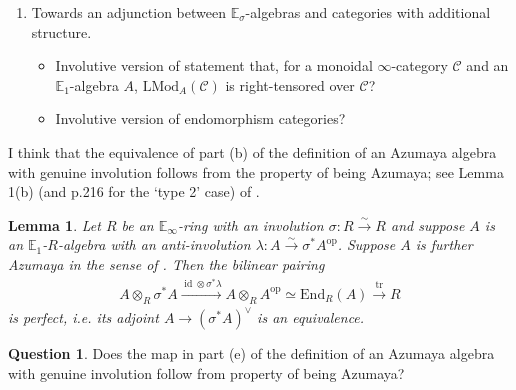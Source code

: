 \documentclass{article}
\DeclareMathOperator{\id}{id} %
\newcommand{\EE}{\mathbb{E}}
\newcommand{\op}{\mathrm{op}}
\newtheorem{lemma}[theorem]{Lemma}
\theoremstyle{definition}
\newtheorem{question}[theorem]{Question}
\newcommand{\Lucy}[1]{\todo[color=cyan!30]{\footnotesize L: #1}}
\begin{document}
\begin{enumerate}[label=(\alph*)]
\begin{itemize}
    \end{itemize} 
    \item Towards an adjunction between $ \EE_\sigma $-algebras and categories with additional structure.  
    \begin{itemize}
        \item Involutive version of statement that, for a monoidal $ \infty $-category $ \mathcal{C} $ and an $ \EE_1 $-algebra $ A $, $ \mathrm{LMod}_A(\mathcal{C}) $ is right-tensored over $ \mathcal{C} $? 
        \item Involutive version of endomorphism categories? \cite[\S4.7.1]{LurHA}
    \end{itemize}
\end{enumerate} 
I think that the equivalence of part (b) of the definition of an Azumaya algebra with genuine involution follows from the property of being Azumaya; see Lemma 1(b) (and p.216 for the `type 2' case) of \cite{MR1162189}. 
\begin{lemma}
    Let $ R $ be an $ \EE_\infty $-ring with an involution $ \sigma \colon R \xrightarrow{\sim} R$ and suppose $ A $ is an $ \EE_1 $-$ R $-algebra with an anti-involution $ \lambda \colon A \xrightarrow{\sim} \sigma^* A^\op $. 
    Suppose $ A $ is further Azumaya in the sense of \Lucy{reference}. 
    Then the bilinear pairing 
    \begin{equation*}
    \begin{split}
        A \otimes_R \sigma^* A \xrightarrow{\id \otimes \sigma^*\lambda} A \otimes_R A^\op \simeq \mathrm{End}_R(A) \xrightarrow{\mathrm{tr}} R     
    \end{split}    
    \end{equation*}
    is perfect, i.e. its adjoint $ A \to (\sigma^* A)^\vee $ is an equivalence. 
\end{lemma}
\begin{question}
    Does the map in part (e) of the definition of an Azumaya algebra with genuine involution follow from property of being Azumaya? 
\end{question}
\end{document}

